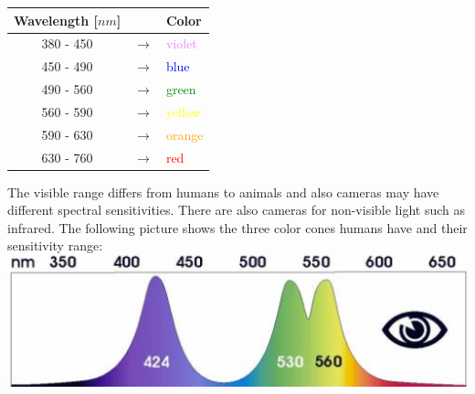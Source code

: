\documentclass[a4paper, fontsize=8pt, landscape, DIV=1]{scrartcl}
\begin{document}
\begin{multicols*}{4}
\begin{center}
			\begin{tabular}{c l l}
				\hline 
				\hline
				Wavelength [$nm$] &  & Color \\ 
				\hline 
				380 - 450 & $\rightarrow$ & \textcolor{violet}{violet} \\ 
				450 - 490 & $\rightarrow$ & \textcolor{blue}{blue} \\ 
				490 - 560 & $\rightarrow$ & \textcolor{green}{green} \\ 
				560 - 590 & $\rightarrow$ & \textcolor{yellow}{yellow} \\ 
				590 - 630 & $\rightarrow$ & \textcolor{orange}{orange} \\ 
				630 - 760 & $\rightarrow$ & \textcolor{red}{red} \\
				\hline
				\hline 
			\end{tabular}
		\end{center}
		The visible range differs from humans to animals and also cameras may have different spectral sensitivities. There are also cameras for non-visible light such as infrared. The following picture shows the three color cones humans have and their sensitivity range: 
		\includegraphics[width=\columnwidth]{images/Introduction/human_cones.png}
		  

\end{multicols*}
\end{document}
